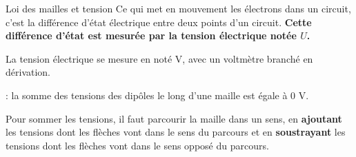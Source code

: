 \vspace*{-10pt}
\begin{doc}{Loi des mailles et tension}
  Ce qui met en mouvement les électrons dans un circuit, c'est la différence d'état électrique entre deux points d'un circuit.
  \textbf{Cette différence d'état est mesurée par la tension électrique notée $U$.}
  \begin{encart}
    La tension électrique se mesure en  noté V, avec un voltmètre branché en dérivation.
  \end{encart}
  \begin{encart}
     : la somme des tensions des dipôles le long d'une maille est égale à 0 V.
  \end{encart}
  \chevron Pour sommer les tensions, il faut parcourir la maille dans un sens, en \textbf{ajoutant} les tensions dont les flèches vont dans le sens du parcours et en \textbf{soustrayant} les tensions dont les flèches vont dans le sens opposé du parcours.
\end{doc}

\vspace*{-8pt}
